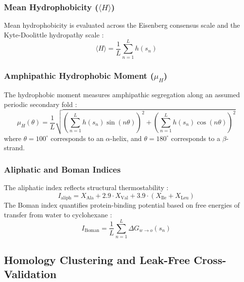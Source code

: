 \documentclass[11pt,a4paper]{article}
\begin{document}
\subsubsection{Mean Hydrophobicity ($\langle H \rangle$)}
Mean hydrophobicity is evaluated across the Eisenberg consensus scale \cite{eisenberg1984analysis} and the Kyte-Doolittle hydropathy scale \cite{kyte1982simple}:
\begin{equation}
\langle H \rangle = \frac{1}{L} \sum_{n=1}^L h(s_n)
\end{equation}

\subsubsection{Amphipathic Hydrophobic Moment ($\mu_H$)}
The hydrophobic moment measures amphipathic segregation along an assumed periodic secondary fold \cite{eisenberg1984analysis}:
\begin{equation}
\mu_H(\theta) = \frac{1}{L} \sqrt{\left(\sum_{n=1}^L h(s_n) \sin(n \theta)\right)^2 + \left(\sum_{n=1}^L h(s_n) \cos(n \theta)\right)^2}
\end{equation}
where $\theta = 100^\circ$ corresponds to an $\alpha$-helix, and $\theta = 180^\circ$ corresponds to a $\beta$-strand.

\subsubsection{Aliphatic and Boman Indices}
The aliphatic index reflects structural thermostability \cite{ikai1980thermostability}:
\begin{equation}
I_{\text{aliph}} = X_{\text{Ala}} + 2.9 \cdot X_{\text{Val}} + 3.9 \cdot (X_{\text{Ile}} + X_{\text{Leu}})
\end{equation}
The Boman index quantifies protein-binding potential based on free energies of transfer from water to cyclohexane \cite{boman2003antibacterial}:
\begin{equation}
I_{\text{Boman}} = \frac{1}{L} \sum_{n=1}^L \Delta G_{w \to o}(s_n)
\end{equation}

\subsection{Homology Clustering and Leak-Free Cross-Validation}
\end{document}
